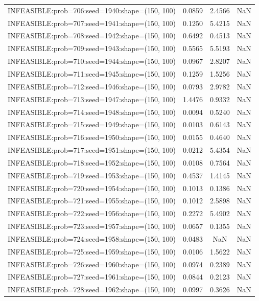\begin{longtable}{lccc}
INFEASIBLE:prob=706:seed=1940:shape=(150, 100) & 0.0859 &  2.4566 &    NaN \\
INFEASIBLE:prob=707:seed=1941:shape=(150, 100) & 0.1250 &  5.4215 &    NaN \\
INFEASIBLE:prob=708:seed=1942:shape=(150, 100) & 0.6492 &  0.4513 &    NaN \\
INFEASIBLE:prob=709:seed=1943:shape=(150, 100) & 0.5565 &  5.5193 &    NaN \\
INFEASIBLE:prob=710:seed=1944:shape=(150, 100) & 0.0967 &  2.8207 &    NaN \\
INFEASIBLE:prob=711:seed=1945:shape=(150, 100) & 0.1259 &  1.5256 &    NaN \\
INFEASIBLE:prob=712:seed=1946:shape=(150, 100) & 0.0793 &  2.9782 &    NaN \\
INFEASIBLE:prob=713:seed=1947:shape=(150, 100) & 1.4476 &  0.9332 &    NaN \\
INFEASIBLE:prob=714:seed=1948:shape=(150, 100) & 0.0094 &  0.5240 &    NaN \\
INFEASIBLE:prob=715:seed=1949:shape=(150, 100) & 0.0103 &  0.6143 &    NaN \\
INFEASIBLE:prob=716:seed=1950:shape=(150, 100) & 0.0155 &  0.4640 &    NaN \\
INFEASIBLE:prob=717:seed=1951:shape=(150, 100) & 0.0212 &  5.4354 &    NaN \\
INFEASIBLE:prob=718:seed=1952:shape=(150, 100) & 0.0108 &  0.7564 &    NaN \\
INFEASIBLE:prob=719:seed=1953:shape=(150, 100) & 0.4537 &  1.4145 &    NaN \\
INFEASIBLE:prob=720:seed=1954:shape=(150, 100) & 0.1013 &  0.1386 &    NaN \\
INFEASIBLE:prob=721:seed=1955:shape=(150, 100) & 0.1012 &  2.5898 &    NaN \\
INFEASIBLE:prob=722:seed=1956:shape=(150, 100) & 0.2272 &  5.4902 &    NaN \\
INFEASIBLE:prob=723:seed=1957:shape=(150, 100) & 0.0657 &  0.1355 &    NaN \\
INFEASIBLE:prob=724:seed=1958:shape=(150, 100) & 0.0483 &     NaN &    NaN \\
INFEASIBLE:prob=725:seed=1959:shape=(150, 100) & 0.0106 &  1.5622 &    NaN \\
INFEASIBLE:prob=726:seed=1960:shape=(150, 100) & 0.0974 &  0.2389 &    NaN \\
INFEASIBLE:prob=727:seed=1961:shape=(150, 100) & 0.0844 &  0.2123 &    NaN \\
INFEASIBLE:prob=728:seed=1962:shape=(150, 100) & 0.0997 &  0.3626 &    NaN \\

\end{longtable}
